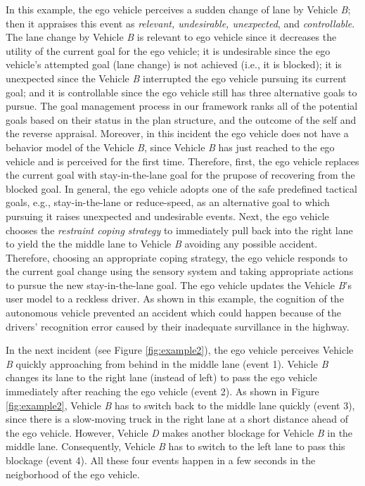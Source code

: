 \documentclass[journal, 11pt]{IEEEtran}
\begin{document}
In this example, the ego vehicle perceives a sudden change of lane by Vehicle
\textit{B}; then it appraises this event as \textit{relevant, undesirable,
unexpected}, and \textit{controllable}. The lane change by Vehicle \textit{B} is
relevant to ego vehicle since it decreases the utility of the current goal for
the ego vehicle; it is undesirable since the ego vehicle's attempted goal (lane
change) is not achieved (i.e., it is blocked); it is unexpected since the
Vehicle \textit{B} interrupted the ego vehicle pursuing its current goal; and it
is controllable since the ego vehicle still has three alternative goals to
pursue. The goal management process in our framework ranks all of the potential
goals based on their status in the plan structure, and the outcome of the self
and the reverse appraisal. Moreover, in this incident the ego vehicle does not
have a behavior model of the Vehicle \textit{B}, since Vehicle \textit{B} has
just reached to the ego vehicle and is perceived for the first time. Therefore,
first, the ego vehicle replaces the current goal with stay-in-the-lane goal for
the prupose of recovering from the blocked goal. In general, the ego vehicle
adopts one of the safe predefined tactical goals, e.g., stay-in-the-lane or
reduce-speed, as an alternative goal to which pursuing it raises unexpected and
undesirable events. Next, the ego vehicle chooses the \textit{restraint coping
strategy} to immediately pull back into the right lane to yield the the middle
lane to Vehicle \textit{B} avoiding any possible accident. Therefore, choosing
an appropriate coping strategy, the ego vehicle responds to the current goal
change using the sensory system and taking appropriate actions to pursue the new
stay-in-the-lane goal. The ego vehicle updates the Vehicle \textit{B}'s user
model to a reckless driver. As shown in this example, the cognition of the
autonomous vehicle prevented an accident which could happen because of the
drivers' recognition error caused by their inadequate survillance in the
highway.

In the next incident (see Figure \ref{fig:example2}), the ego vehicle perceives
Vehicle \textit{B} quickly approaching from behind in the middle lane (event 1).
Vehicle \textit{B} changes its lane to the right lane (instead of left) to pass
the ego vehicle immediately after reaching the ego vehicle (event 2). As
shown in Figure \ref{fig:example2}, Vehicle \textit{B} has to switch back to the
middle lane quickly (event 3), since there is a slow-moving truck in the right
lane at a short distance ahead of the ego vehicle. However, Vehicle \textit{D}
makes another blockage for Vehicle \textit{B} in the middle lane. Consequently,
Vehicle \textit{B} has to switch to the left lane to pass this blockage (event
4). All these four events happen in a few seconds in the neigborhood of the ego
vehicle.
\end{document}
